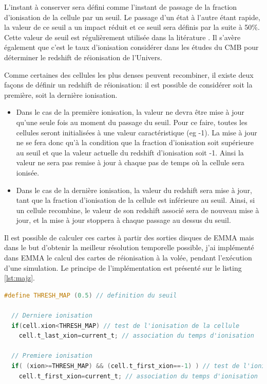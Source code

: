 L'instant à conserver sera défini comme l'instant de passage de la fraction d'ionisation de la cellule par un seuil.
Le passage d'un état à l'autre étant rapide, la valeur de ce seuil a un impact réduit et ce seuil sera définis par la suite à 50\%.
Cette valeur de seuil est régulièrement utilisée dans la litérature \citep{iliev_cosmological_2006, doi:10.1111/j.1365-2966.2011.18219.x, 2012A&A...548A...9C}.
Il s'avère également que c'est le taux d'ionisation considérer dans les études du \ac{CMB} pour déterminer le redshift de réionisation de l'Univers.

Comme certaines des cellules les plus denses peuvent recombiner, il existe deux façons de définir un redshift de réionisation: il est possible de considérer soit la première, soit la dernière ionisation.

\begin{itemize}
\item Dans le cas de la première ionisation, la valeur ne devra être mise à jour qu'une seule fois au moment du passage du seuil.
Pour ce faire, toutes les cellules seront initialisées à une valeur caractéristique (eg -1).
La mise à jour ne se fera donc qu'à la condition que la fraction d'ionisation soit supérieure au seuil et que la valeur actuelle du redshift d'ionisation soit -1.
Ainsi la valeur ne sera pas remise à jour à chaque pas de temps où la cellule sera ionisée. 

\item Dans le cas de la dernière ionisation, la valeur du redshift sera mise à jour, tant que la fraction d'ionisation de la cellule est inférieure au seuil.
Ainsi, si un cellule recombine, le valeur de son redshift associé sera de nouveau mise à jour, et la mise à jour stoppera à chaque passage au dessus du seuil.
\end{itemize}

Il est possible de calculer ces cartes à partir des sorties disques de EMMA mais dans le but d'obtenir la meilleur résolution temporelle possible, j'ai implémenté dans EMMA le calcul des cartes de réionisation à la volée, pendant l'exécution d'une simulation.
Le principe de l'implémentation est présenté sur le listing \ref{lst:majz}.

\begin{lstlisting}[float=bth,language=c,frame=tb,caption={Mise a jour du redshift de reionisation},label=lst:majz]
  #define THRESH_MAP (0.5) // definition du seuil

  // Derniere ionisation 
  if(cell.xion<THRESH_MAP) // test de l'ionisation de la cellule
    cell.t_last_xion=current_t; // association du temps d'ionisation 

  // Premiere ionisation 
  if( (xion>=THRESH_MAP) && (cell.t_first_xion==-1) ) // test de l'ionisation de la cellule et de premiere ionisation
    cell.t_first_xion=current_t; // association du temps d'ionisation 
\end{lstlisting}

